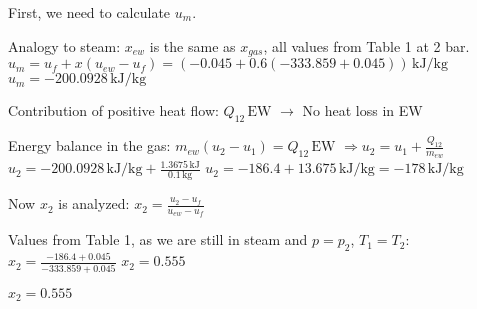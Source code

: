 First, we need to calculate \( u_m \).  

Analogy to steam: \( x_{ew} \) is the same as \( x_{gas} \), all values from Table 1 at 2 bar.  
\( u_m = u_f + x (u_{ew} - u_f) = (-0.045 + 0.6 (-333.859 + 0.045)) \, \text{kJ/kg} \)  
\( u_m = -200.0928 \, \text{kJ/kg} \)  

Contribution of positive heat flow:  
\( Q_{12} \, \text{EW} \)  
\( \rightarrow \) No heat loss in EW  

Energy balance in the gas:  
\( m_{ew} (u_2 - u_1) = Q_{12} \, \text{EW} \)  
\( \Rightarrow u_2 = u_1 + \frac{Q_{12}}{m_{ew}} \)  
\( u_2 = -200.0928 \, \text{kJ/kg} + \frac{1.3675 \, \text{kJ}}{0.1 \, \text{kg}} \)  
\( u_2 = -186.4 + 13.675 \, \text{kJ/kg} = -178 \, \text{kJ/kg} \)  

Now \( x_2 \) is analyzed:  
\( x_2 = \frac{u_2 - u_f}{u_{ew} - u_f} \)  

Values from Table 1, as we are still in steam and \( p = p_2 \), \( T_1 = T_2 \):  
\( x_2 = \frac{-186.4 + 0.045}{-333.859 + 0.045} \)  
\( x_2 = 0.555 \)  

\( x_2 = 0.555 \)